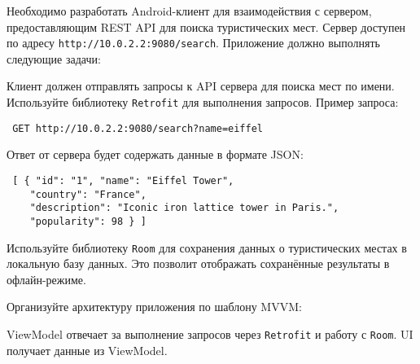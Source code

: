 
Необходимо разработать Android-клиент для взаимодействия с сервером, предоставляющим REST API для поиска туристических мест. Сервер доступен по адресу \texttt{http://10.0.2.2:9080/search}. Приложение должно выполнять следующие задачи:


Клиент должен отправлять запросы к API сервера для поиска мест по имени. Используйте библиотеку \texttt{Retrofit} для выполнения запросов. Пример запроса:

\begin{verbatim} GET http://10.0.2.2:9080/search?name=eiffel \end{verbatim}

Ответ от сервера будет содержать данные в формате JSON:

\begin{verbatim} [ { "id": "1", "name": "Eiffel Tower", 
    "country": "France", 
    "description": "Iconic iron lattice tower in Paris.", 
    "popularity": 98 } ] \end{verbatim}


Используйте библиотеку \texttt{Room} для сохранения данных о туристических местах в локальную базу данных. Это позволит отображать сохранённые результаты в офлайн-режиме.


Организуйте архитектуру приложения по шаблону MVVM:

ViewModel отвечает за выполнение запросов через \texttt{Retrofit} и работу с \texttt{Room}.
UI получает данные из ViewModel.


